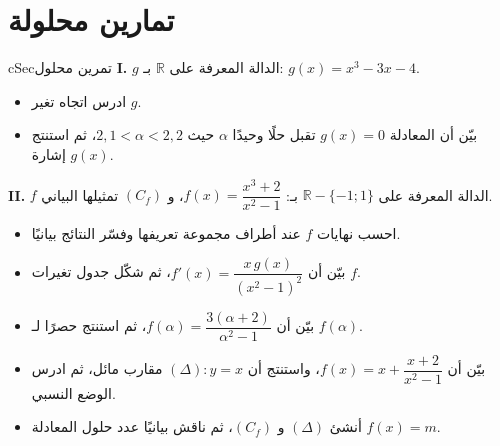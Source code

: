 \documentclass[12pt,a4paper]{article}
\newenvironment{BOX}[2]{\begin{otherlanguage}{english}\begin{arbox}{#1}{#2}}{\end{arbox}\end{otherlanguage}}
\newcounter{exo}
\newcommand{\R}{\mathbb{R}}
\newenvironment{sq}{\begin{itemize}[leftmargin=2.4em,itemsep=3pt]}{\end{itemize}}
\newcommand{\qa}{\item[(أ)]}\newcommand{\qb}{\item[(ب)]}\newcommand{\qc}{\item[(جـ)]}\newcommand{\qd}{\item[(د)]}\newcommand{\qe}{\item[(هـ)]}
\newenvironment{tmr}{\stepcounter{exo}\begin{BOX}{cSec}{تمرين محلول \theexo}}{\end{BOX}}
\begin{document}
\section{تمارين محلولة}
\begin{tmr}
\textbf{I.} $g$ الدالة المعرفة على $\R$ بـ: $g(x)=x^{3}-3x-4$.
\begin{sq}
\qa ادرس اتجاه تغير $g$.
\qb بيّن أن المعادلة $g(x)=0$ تقبل حلًا وحيدًا $\alpha$ حيث $2{,}1<\alpha<2{,}2$، ثم استنتج إشارة $g(x)$.
\end{sq}
\textbf{II.} $f$ الدالة المعرفة على $\R-\{-1;1\}$ بـ: $f(x)=\dfrac{x^{3}+2}{x^{2}-1}$، و $(C_f)$ تمثيلها البياني.
\begin{sq}
\qa احسب نهايات $f$ عند أطراف مجموعة تعريفها وفسّر النتائج بيانيًا.
\qb بيّن أن $f'(x)=\dfrac{x\,g(x)}{\left(x^{2}-1\right)^{2}}$، ثم شكّل جدول تغيرات $f$.
\qc بيّن أن $f(\alpha)=\dfrac{3(\alpha+2)}{\alpha^{2}-1}$، ثم استنتج حصرًا لـ $f(\alpha)$.
\qd بيّن أن $f(x)=x+\dfrac{x+2}{x^{2}-1}$، واستنتج أن $(\Delta):y=x$ مقارب مائل، ثم ادرس الوضع النسبي.
\qe أنشئ $(\Delta)$ و $(C_f)$، ثم ناقش بيانيًا عدد حلول المعادلة $f(x)=m$.
\end{sq}
\end{tmr}
\end{document}
